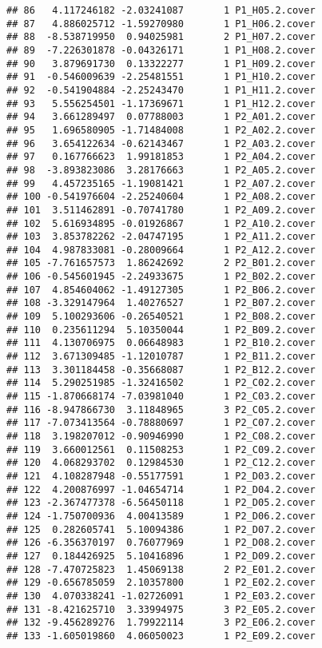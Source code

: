 \documentclass[]{article}
\begin{document}
\begin{verbatim}
## 86   4.117246182 -2.03241087       1 P1_H05.2.cover
## 87   4.886025712 -1.59270980       1 P1_H06.2.cover
## 88  -8.538719950  0.94025981       2 P1_H07.2.cover
## 89  -7.226301878 -0.04326171       1 P1_H08.2.cover
## 90   3.879691730  0.13322277       1 P1_H09.2.cover
## 91  -0.546009639 -2.25481551       1 P1_H10.2.cover
## 92  -0.541904884 -2.25243470       1 P1_H11.2.cover
## 93   5.556254501 -1.17369671       1 P1_H12.2.cover
## 94   3.661289497  0.07788003       1 P2_A01.2.cover
## 95   1.696580905 -1.71484008       1 P2_A02.2.cover
## 96   3.654122634 -0.62143467       1 P2_A03.2.cover
## 97   0.167766623  1.99181853       1 P2_A04.2.cover
## 98  -3.893823086  3.28176663       1 P2_A05.2.cover
## 99   4.457235165 -1.19081421       1 P2_A07.2.cover
## 100 -0.541976604 -2.25240604       1 P2_A08.2.cover
## 101  3.511462891 -0.70741780       1 P2_A09.2.cover
## 102  5.616934895 -0.01926867       1 P2_A10.2.cover
## 103  3.853782262 -2.04747195       1 P2_A11.2.cover
## 104  4.987833081 -0.28009664       1 P2_A12.2.cover
## 105 -7.761657573  1.86242692       2 P2_B01.2.cover
## 106 -0.545601945 -2.24933675       1 P2_B02.2.cover
## 107  4.854604062 -1.49127305       1 P2_B06.2.cover
## 108 -3.329147964  1.40276527       1 P2_B07.2.cover
## 109  5.100293606 -0.26540521       1 P2_B08.2.cover
## 110  0.235611294  5.10350044       1 P2_B09.2.cover
## 111  4.130706975  0.06648983       1 P2_B10.2.cover
## 112  3.671309485 -1.12010787       1 P2_B11.2.cover
## 113  3.301184458 -0.35668087       1 P2_B12.2.cover
## 114  5.290251985 -1.32416502       1 P2_C02.2.cover
## 115 -1.870668174 -7.03981040       1 P2_C03.2.cover
## 116 -8.947866730  3.11848965       3 P2_C05.2.cover
## 117 -7.073413564 -0.78880697       1 P2_C07.2.cover
## 118  3.198207012 -0.90946990       1 P2_C08.2.cover
## 119  3.660012561  0.11508253       1 P2_C09.2.cover
## 120  4.068293702  0.12984530       1 P2_C12.2.cover
## 121  4.108287948 -0.55177591       1 P2_D03.2.cover
## 122  4.200876997 -1.04654714       1 P2_D04.2.cover
## 123 -2.367477378 -6.56450118       1 P2_D05.2.cover
## 124 -1.750700936  4.00413589       1 P2_D06.2.cover
## 125  0.282605741  5.10094386       1 P2_D07.2.cover
## 126 -6.356370197  0.76077969       1 P2_D08.2.cover
## 127  0.184426925  5.10416896       1 P2_D09.2.cover
## 128 -7.470725823  1.45069138       2 P2_E01.2.cover
## 129 -0.656785059  2.10357800       1 P2_E02.2.cover
## 130  4.070338241 -1.02726091       1 P2_E03.2.cover
## 131 -8.421625710  3.33994975       3 P2_E05.2.cover
## 132 -9.456289276  1.79922114       3 P2_E06.2.cover
## 133 -1.605019860  4.06050023       1 P2_E09.2.cover

\end{verbatim}
\end{document}
